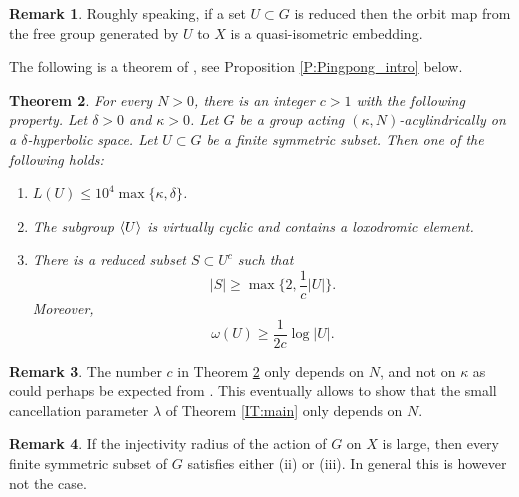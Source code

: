 \documentclass[leqno,a4paper,10pt]{amsart}
\theoremstyle{plain}
\newtheorem{thm}{Theorem}[section]
\theoremstyle{definition}
\newtheorem{rem}[thm]{Remark}
\theoremstyle{remark}
\let\le\leqslant
\let\ge\geqslant
\newcommand{\group}[1]{
	\mathchoice%
	{\left\langle #1\right\rangle}%
	{\langle #1\rangle}%
	{\langle #1\rangle}%
	{\langle #1\rangle}%
}
\begin{document}
\begin{rem}
	Roughly speaking, if a  set $U\subset G$ is reduced then  the orbit map from the free group generated by $U$ to $X$ is a quasi-isometric embedding.
\end{rem}

The following is a theorem of \cite{koubi_croissance_1998, arzhantseva_lower_2006,fujiwara_rates_2021}, see Proposition \ref{P:Pingpong_intro} below. 

\begin{thm}
	\label{thm:growth-trichotomy-intro}
	For every $N>0$, there is an integer $c>1$ with the following property. Let $\delta>0$ and $\kappa >0$. Let $G$ be a group acting $(\kappa,N)$-acylindrically on a $\delta$-hyperbolic space. Let $U\subset G$ be a finite symmetric subset. Then one of the following holds:
	\begin{enumerate}[label=(\roman*)]
		\item $L(U)\le 10^4\max\{\kappa,\delta\}$. 
		\item The subgroup $\group{U}$ is virtually cyclic and contains a loxodromic element.
		\item There is a reduced subset $S\subset U^c$ such that
		$$|S| \ge \max \{ 2, \frac{1}{c} |U| \}.$$
		Moreover, 
		$$\omega(U) \ge \frac{1}{2c} \log |U|.$$
	\end{enumerate}
\end{thm}
\begin{rem} The number $c$ in Theorem \ref{thm:growth-trichotomy-intro} only depends on $N$, and not on $\kappa$ as could perhaps be expected from \cite[Proposition 2.10]{fujiwara_rates_2021}. This eventually allows to show that the small cancellation parameter $\lambda$ of Theorem \ref{IT:main} only depends on $N$. 
\end{rem}

\begin{rem} 
	If the injectivity radius of the action of $G$ on $X$ is large, then every finite symmetric subset of $G$ satisfies either (ii) or (iii). In general this is however not the case.  
\end{rem}
\end{document}
